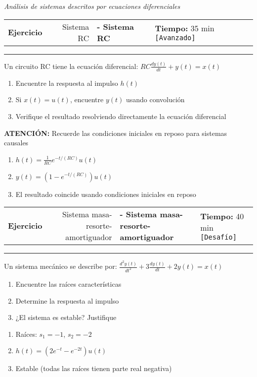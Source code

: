 \documentclass[11pt]{article}
\makeatletter
\newcommand{\avanzado}{\texttt{[Avanzado]}}
\newcommand{\desafio}{\texttt{[Desafío]}}
\newcounter{ejercicio}
\newenvironment{ejercicio}[3][]{%
  \stepcounter{ejercicio}
  \vspace{0.6cm}
  \noindent\begin{tabularx}{\linewidth}{@{} X r @{}}
    \textbf{Ejercicio \theejercicio} \ifx&#1&\else\textbf{ - #1}\fi
    &
    \textbf{Tiempo:} #2 min \quad #3
  \end{tabularx}
  \hrule
  \vspace{0.3cm}
}{%
  \vspace{0.5cm}
}
\newcommand{\atencion}[1]{%
  \begin{tcolorbox}[
    colback=black!5,
    colframe=black!60,
    boxrule=1pt,
    rounded corners=3pt,
    left=8pt,
    right=8pt,
    top=5pt,
    bottom=5pt
  ]
  \textbf{ATENCIÓN:} #1
  \end{tcolorbox}
}
\newif\ifsoluciones
\newenvironment{solucion}{%
  \ifsoluciones
    \vspace{0.3cm}
    \begin{tcolorbox}[
      enhanced,
      breakable,
      colback=black!5,
      colframe=black!50,
      boxrule=1pt,
      rounded corners=5pt,
      left=8pt,
      right=8pt,
      top=8pt,
      bottom=8pt,
      title={\textbf{SOLUCIÓN}},
      fonttitle=\bfseries
    ]
  \fi
}{%
  \ifsoluciones
    \end{tcolorbox}
  \fi
}
\newcommand{\espaciotrabajo}[1][5cm]{\vspace{#1}}
\newenvironment{grupoejercicio}[2]{%
  \vspace{0.8cm}
  \begin{tcolorbox}[
    enhanced,
    colback=black!5,
    colframe=black,
    boxrule=1pt,
    rounded corners=8pt,
    title={\textbf{#1}},
    fonttitle=\Large\bfseries
  ]
  \textit{#2}
  \end{tcolorbox}
  \vspace{0.3cm}
}{%
  \vspace{0.5cm}
}
\makeatother
\begin{document}
\begin{grupoejercicio}{Sistemas y Ecuaciones Diferenciales}{Análisis de sistemas descritos por ecuaciones diferenciales}

\begin{ejercicio}[Sistema RC]{35}{\avanzado}
  Un circuito RC tiene la ecuación diferencial:
  $RC\frac{dy(t)}{dt} + y(t) = x(t)$
  
  \begin{enumerate}[label=\alph*)]
    \item Encuentre la respuesta al impulso $h(t)$
    \item Si $x(t) = u(t)$, encuentre $y(t)$ usando convolución
    \item Verifique el resultado resolviendo directamente la ecuación diferencial
  \end{enumerate}
  
  \atencion{Recuerde las condiciones iniciales en reposo para sistemas causales}
  
  \espaciotrabajo[10cm]
  
  \begin{solucion}
    \begin{enumerate}[label=\alph*)]
      \item $h(t) = \frac{1}{RC}e^{-t/(RC)}u(t)$
      \item $y(t) = (1 - e^{-t/(RC)})u(t)$
      \item El resultado coincide usando condiciones iniciales en reposo
    \end{enumerate}
  \end{solucion}
\end{ejercicio}

\begin{ejercicio}[Sistema masa-resorte-amortiguador]{40}{\desafio}
  Un sistema mecánico se describe por:
  $\frac{d^2y(t)}{dt^2} + 3\frac{dy(t)}{dt} + 2y(t) = x(t)$
  
  \begin{enumerate}[label=\alph*)]
    \item Encuentre las raíces características
    \item Determine la respuesta al impulso
    \item ¿El sistema es estable? Justifique
  \end{enumerate}
  
  \espaciotrabajo[8cm]
  
  \begin{solucion}
    \begin{enumerate}[label=\alph*)]
      \item Raíces: $s_1 = -1$, $s_2 = -2$
      \item $h(t) = (2e^{-t} - e^{-2t})u(t)$
      \item Estable (todas las raíces tienen parte real negativa)
    \end{enumerate}
  \end{solucion}
\end{ejercicio}

\end{grupoejercicio}
\end{document}
